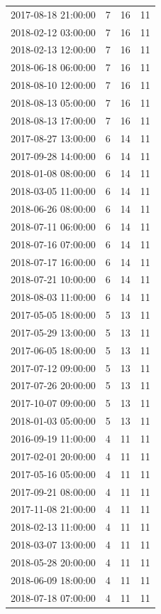 \begin{tabular}{lrrr}
2017-08-18 21:00:00 & 7 & 16 & 11 \\
2018-02-12 03:00:00 & 7 & 16 & 11 \\
2018-02-13 12:00:00 & 7 & 16 & 11 \\
2018-06-18 06:00:00 & 7 & 16 & 11 \\
2018-08-10 12:00:00 & 7 & 16 & 11 \\
2018-08-13 05:00:00 & 7 & 16 & 11 \\
2018-08-13 17:00:00 & 7 & 16 & 11 \\
2017-08-27 13:00:00 & 6 & 14 & 11 \\
2017-09-28 14:00:00 & 6 & 14 & 11 \\
2018-01-08 08:00:00 & 6 & 14 & 11 \\
2018-03-05 11:00:00 & 6 & 14 & 11 \\
2018-06-26 08:00:00 & 6 & 14 & 11 \\
2018-07-11 06:00:00 & 6 & 14 & 11 \\
2018-07-16 07:00:00 & 6 & 14 & 11 \\
2018-07-17 16:00:00 & 6 & 14 & 11 \\
2018-07-21 10:00:00 & 6 & 14 & 11 \\
2018-08-03 11:00:00 & 6 & 14 & 11 \\
2017-05-05 18:00:00 & 5 & 13 & 11 \\
2017-05-29 13:00:00 & 5 & 13 & 11 \\
2017-06-05 18:00:00 & 5 & 13 & 11 \\
2017-07-12 09:00:00 & 5 & 13 & 11 \\
2017-07-26 20:00:00 & 5 & 13 & 11 \\
2017-10-07 09:00:00 & 5 & 13 & 11 \\
2018-01-03 05:00:00 & 5 & 13 & 11 \\
2016-09-19 11:00:00 & 4 & 11 & 11 \\
2017-02-01 20:00:00 & 4 & 11 & 11 \\
2017-05-16 05:00:00 & 4 & 11 & 11 \\
2017-09-21 08:00:00 & 4 & 11 & 11 \\
2017-11-08 21:00:00 & 4 & 11 & 11 \\
2018-02-13 11:00:00 & 4 & 11 & 11 \\
2018-03-07 13:00:00 & 4 & 11 & 11 \\
2018-05-28 20:00:00 & 4 & 11 & 11 \\
2018-06-09 18:00:00 & 4 & 11 & 11 \\
2018-07-18 07:00:00 & 4 & 11 & 11 \\

\end{tabular}
